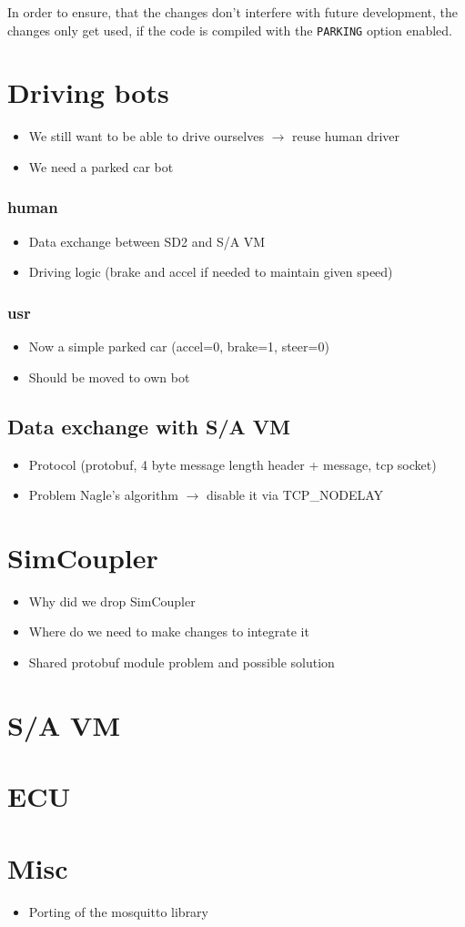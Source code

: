 \documentclass[paper=a4, fontsize=11pt]{scrreprt}
\begin{document}
In order to ensure, that the changes don't interfere with future development,
the changes only get used, if the code is compiled with the \texttt{PARKING} option enabled.

\section{Driving bots}
\begin{itemize}
  \item We still want to be able to drive ourselves $\rightarrow$ reuse human driver
  \item We need a parked car bot
\end{itemize}

\subsubsection{human}
\begin{itemize}
  \item Data exchange between SD2 and S/A VM
  \item Driving logic (brake and accel if needed to maintain given speed)
\end{itemize}
\subsubsection{usr}
\begin{itemize}
  \item Now a simple parked car (accel=0, brake=1, steer=0)
  \item Should be moved to own bot
\end{itemize}
\subsection{Data exchange with S/A VM}
\begin{itemize}
  \item Protocol (protobuf, 4 byte message length header + message, tcp socket)
  \item Problem Nagle's algorithm $\rightarrow$ disable it via TCP\_NODELAY
\end{itemize}
\section{SimCoupler}
\begin{itemize}
  \item Why did we drop SimCoupler
  \item Where do we need to make changes to integrate it
  \item Shared protobuf module problem and possible solution
\end{itemize}
\section{S/A VM}
\section{ECU}
\section{Misc}
\begin{itemize}
  \item Porting of the mosquitto library %
\end{itemize}


\end{document}
